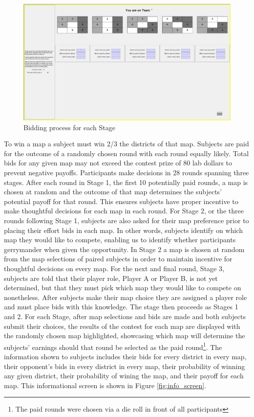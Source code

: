 \documentclass[AER]{AEA}
\begin{document}
\begin{figure}[h]
\centering
\includegraphics[scale=0.2]{map_bids.jpg}
\caption{Bidding process for each Stage}
\label{fig:map_bids}
\end{figure}
To win a map a subject must win 2/3 the districts of that map. Subjects are paid for the outcome of a randomly chosen round with each round equally likely. Total bids for any given map may not exceed the contest prize of 80 lab dollars to prevent negative payoffs.
Participants make decisions in 28 rounds spanning three stages. After each round in Stage 1, the first 10 potentially paid rounds, a map is chosen at random and the outcome of that map determines the subjects' potential payoff for that round. This ensures subjects have proper incentive to make thoughtful decisions for each map in each round. For Stage 2, or the three rounds following Stage 1, subjects are also asked for their map preference prior to placing their effort bids in each map. In other words, subjects identify on which map they would like to compete, enabling us to identify whether participants gerrymander when given the opportunity. In Stage 2 a map is chosen at random from the map selections of paired subjects in order to maintain incentive for thoughtful decisions on every map. For the next and final round, Stage 3, subjects are told that their player role, Player A or Player B, is not yet determined, but that they must pick which map they would like to compete on nonetheless. After subjects make their map choice they are assigned a player role and must place bids with this knowledge. The stage then proceeds as Stages 1 and 2. For each Stage, after map selections and bids are made and both subjects submit their choices, the results of the contest for each map are displayed with the randomly chosen map highlighted, showcasing which map will determine the subjects' earnings should that round be selected as the paid round\footnote{The paid rounds were chosen via a die roll in front of all participants}. The information shown to subjects includes their bids for every district in every map, their opponent's bids in every district in every map, their probability of winning any given district, their probability of wining the map, and their payoff for each map. This informational screen is shown in Figure \ref{fig:info_screen}.
\end{document}
